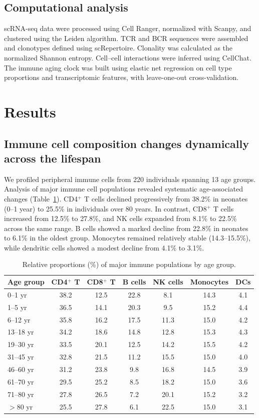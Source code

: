 \documentclass[11pt]{article}
\begin{document}
\subsection{Computational analysis}
scRNA-seq data were processed using Cell Ranger, normalized with Scanpy, and clustered using the Leiden algorithm. TCR and BCR sequences were assembled and clonotypes defined using scRepertoire. Clonality was calculated as the normalized Shannon entropy. Cell--cell interactions were inferred using CellChat. The immune aging clock was built using elastic net regression on cell type proportions and transcriptomic features, with leave-one-out cross-validation.

\section{Results}

\subsection{Immune cell composition changes dynamically across the lifespan}
We profiled peripheral immune cells from 220 individuals spanning 13 age groups. Analysis of major immune cell populations revealed systematic age-associated changes (Table~\ref{tab:composition}). CD4$^+$ T cells declined progressively from 38.2\% in neonates (0--1 year) to 25.5\% in individuals over 80 years. In contrast, CD8$^+$ T cells increased from 12.5\% to 27.8\%, and NK cells expanded from 8.1\% to 22.5\% across the same range. B cells showed a marked decline from 22.8\% in neonates to 6.1\% in the oldest group. Monocytes remained relatively stable (14.3--15.5\%), while dendritic cells showed a modest decline from 4.1\% to 3.1\%.

\begin{table}[h]
\centering
\caption{Relative proportions (\%) of major immune populations by age group.}
\label{tab:composition}
\begin{tabular}{lcccccc}
\toprule
Age group & CD4$^+$ T & CD8$^+$ T & B cells & NK cells & Monocytes & DCs \\
\midrule
0--1 yr & 38.2 & 12.5 & 22.8 & 8.1 & 14.3 & 4.1 \\
1--5 yr & 36.5 & 14.1 & 20.3 & 9.5 & 15.2 & 4.4 \\
6--12 yr & 35.8 & 16.2 & 17.5 & 11.3 & 15.0 & 4.2 \\
13--18 yr & 34.2 & 18.6 & 14.8 & 12.8 & 15.3 & 4.3 \\
19--30 yr & 33.5 & 20.1 & 12.5 & 14.2 & 15.5 & 4.2 \\
31--45 yr & 32.8 & 21.5 & 11.2 & 15.5 & 15.0 & 4.0 \\
46--60 yr & 31.2 & 23.8 & 9.8 & 16.8 & 14.5 & 3.9 \\
61--70 yr & 29.5 & 25.2 & 8.5 & 18.2 & 15.0 & 3.6 \\
71--80 yr & 27.8 & 26.5 & 7.2 & 20.1 & 15.2 & 3.2 \\
$>$80 yr & 25.5 & 27.8 & 6.1 & 22.5 & 15.0 & 3.1 \\
\bottomrule
\end{tabular}
\end{table}
\end{document}
